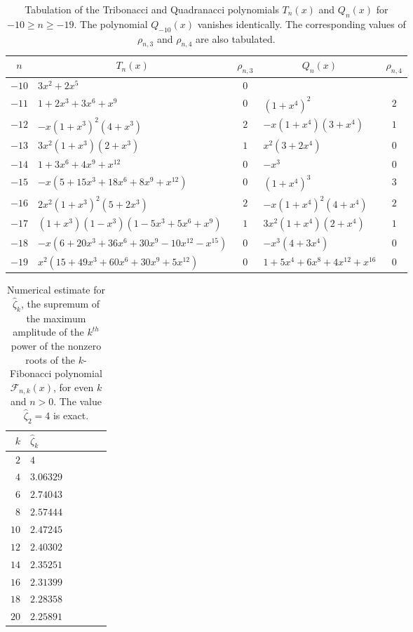 \documentclass[review]{elsarticle}
\theoremstyle{plain}
\begin{document}
\newpage
\begin{table}[!htb]
  \centering
{\begin{tabular}{|r|l|c|l|c|}
  \hline
  \multicolumn{1}{|c|}{$n$} & \multicolumn{1}{c|}{$T_n(x)$} & $\rho_{n,3}$ & \multicolumn{1}{c|}{$Q_n(x)$} & $\rho_{n,4}$ \\ \hline
  $-10$ & $3x^2 +2x^5$ & $0$ & &  \\
  $-11$ & $1 +2x^3 +3x^6 +x^9$ & $0$ & $(1+x^4)^2$ & $2$ \\
  $-12$ & $-x(1+x^3)^2(4+x^3)$ & $2$ & $-x(1+x^4)(3+x^4)$ & $1$ \\
  $-13$ & $3x^2(1+x^3)(2+x^3)$ & $1$ & $x^2(3+2x^4)$ & $0$ \\
  $-14$ & $1 +3x^6 +4x^9 +x^{12}$ & $0$ & $-x^3$ & $0$ \\
  $-15$ & $-x(5 +15x^3 +18x^6 +8x^9 +x^{12})$ & $0$ & $(1+x^4)^3$ & $3$ \\
  $-16$ & $2x^2(1+x^3)^2(5+2x^3)$ & $2$ & $-x(1+x^4)^2(4+x^4)$ & $2$ \\
  $-17$ & $(1+x^3)(1-x^3) (1-5x^3+5x^6+x^9)$ & $1$ & $3x^2(1+x^4)(2+x^4)$ & $1$ \\
  $-18$ & $-x(6+20x^3+36x^6+30x^9-10x^{12}-x^{15})$ & $0$ & $-x^3(4+3x^4)$ & $0$ \\
  $-19$ & $x^2(15 +49x^3 +60x^6 +30x^9 +5x^{12})$ & $0$ & $1 +5x^4 +6x^8 +4x^{12} +x^{16}$ & $0$ \\ \hline
\end{tabular}}
\caption{\label{tb:Tri_Quad_poly_neg}
  Tabulation of the Tribonacci and Quadranacci polynomials $T_n(x)$ and $Q_n(x)$ for
  $-10\ge n\ge -19$.
  The polynomial $Q_{-10}(x)$ vanishes identically.
  The corresponding values of $\rho_{n,3}$ and $\rho_{n,4}$ are also tabulated.}
\end{table}

\newpage
\begin{table}[!htb]
  \centering
\begin{tabular}{|r|l|l|l|l|l|}
\hline  
$k$ & $\hat{\zeta}_k$ \\ \hline
$2$ & $4$ \\
$4$ & $3.06329$ \\
$6$ & $2.74043$ \\
$8$ & $2.57444$ \\
$10$ & $2.47245$ \\
$12$ & $2.40302$ \\
$14$ & $2.35251$ \\
$16$ & $2.31399$ \\
$18$ & $2.28358$ \\
$20$ & $2.25891$ \\ \hline
\end{tabular}
\caption{\label{tb:hat_zeta_k}
  Numerical estimate for $\hat{\zeta}_k$, the supremum of the maximum amplitude of the $k^{th}$ power of the nonzero roots of the $k$-Fibonacci polynomial $\mathcal{F}_{n,k}(x)$, for even $k$ and $n>0$.
The value $\hat{\zeta}_2=4$ is exact.}
\end{table}
\end{document}
